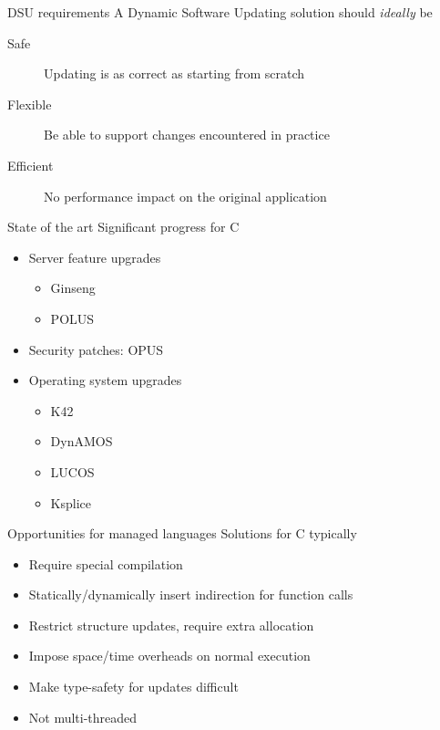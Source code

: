 \begin{frame}{DSU requirements}%
A Dynamic Software Updating solution should \emph{ideally} be
\begin{description}
\item[Safe] Updating is as correct as starting from scratch
\item[Flexible] Be able to support changes encountered in practice
\item[Efficient] No performance impact on the original application
\end{description}
\end{frame}

\begin{frame}{State of the art}%
Significant progress for C
\begin{itemize}
\item Server feature upgrades
  \begin{itemize}
  \item Ginseng \cite{neamtiu06dsu}
  \item POLUS \cite{chen:icse07}
  \end{itemize}
\item Security patches: OPUS \cite{altekar05opus}
\item Operating system upgrades
  \begin{itemize}
  \item K42 \cite{K42reconfig}
  \item DynAMOS \cite{dynamos_eurosys_07}
  \item LUCOS \cite{chen06vee}
  \item Ksplice \cite{Ksplice}
  \end{itemize}
\end{itemize}
\end{frame}

\begin{frame}{Opportunities for managed languages}%
Solutions for C typically
\begin{itemize}
\item Require special compilation
\item Statically/dynamically insert indirection for function calls
\item Restrict structure updates, require extra allocation
\item Impose space/time overheads on normal execution
\item Make type-safety for updates difficult
\item Not multi-threaded
\end{itemize}
\end{frame}

